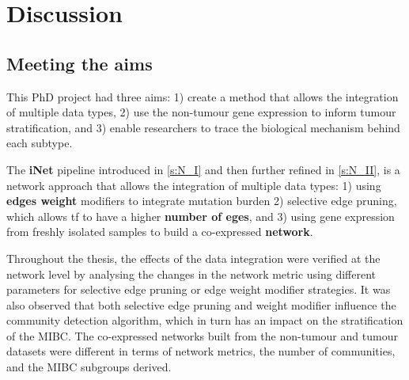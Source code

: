 \chapter{Discussion} \label{s:discussion}

\vspace{3mm}
\vspace{3mm}


\section{Meeting the aims}

This PhD project had three aims: 1) create a method that allows the integration of multiple data types, 2) use the non-tumour gene expression to inform tumour stratification, and 3) enable researchers to trace the biological mechanism behind each subtype.

The \textbf{iNet} pipeline introduced in \cref{s:N_I} and then further refined in \cref{s:N_II}, is a network approach that allows the integration of multiple data types: 1) using \textbf{edges weight} modifiers to integrate mutation burden 2) selective edge pruning, which allows \acrlong{tf} to have a higher \textbf{number of eges}, and 3) using gene expression from freshly isolated samples to build a co-expressed \textbf{network}. 

Throughout the thesis, the effects of the data integration were verified at the network level by analysing the changes in the network metric using different parameters for selective edge pruning or edge weight modifier strategies. It was also observed that both selective edge pruning and weight modifier influence the community detection algorithm, which in turn has an impact on the stratification of the MIBC. The co-expressed networks built from the non-tumour and tumour datasets were different in terms of network metrics, the number of communities, and the MIBC subgroups derived.

